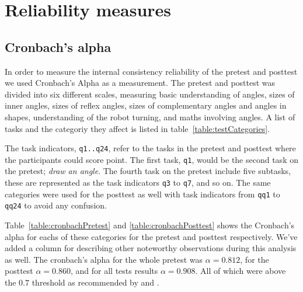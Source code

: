 \chapter{Reliability measures}\label{ch:cronbach}
\section{Cronbach's alpha}
In order to measure the internal consistency reliability of the pretest and posttest we used Cronbach's Alpha as a measurement. 
The pretest and posttest was divided into six different scales, measuring
basic understanding of angles, sizes of inner angles, sizes of reflex angles, sizes of complementary angles and angles in shapes, understanding of the robot turning, and maths involving angles. A list of tasks and the categoriy they affect is listed in table~\ref{table:testCategories}. 

\bigskip\noindent
The task indicators, \texttt{q1..q24}, refer to the tasks in the pretest and posttest where the participants could score point. The first task, \texttt{q1}, would be the second task on the pretest; \textit{draw an angle}. The fourth task on the pretest include five subtasks, these are represented as the task indicators \texttt{q3} to \texttt{q7}, and so on.
The same categories were used for the posttest as well with task indicators from \texttt{qq1} to \texttt{qq24} to avoid any confusion.


\bigskip\noindent
Table~\ref{table:cronbachPretest} and \ref{table:cronbachPosttest} shows the Cronbach's alpha for eachs of these categories for the pretest and posttest respectively. We've added a column for describing other noteworthy observations during this analysis as well. 
The cronbach's alpha for the whole pretest was $\alpha = 0.812$, for the posttest $\alpha = 0.860$, and for all tests results $\alpha = 0.908$. All of which were above the $0.7$ threshold as recommended by \cite{devellis2003scale} and \cite{kline2005principles}.


